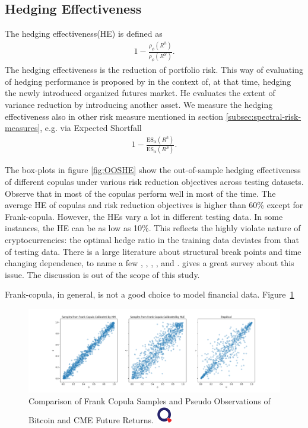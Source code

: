 \subsection{Hedging Effectiveness}\label{subsec:hedging-effectiveness}
The hedging effectiveness(HE) is defined as
\begin{align}
  1- \frac{\rho_\phi(R^h)}{\rho_\phi(R^S)}.
  \end{align}
The hedging effectiveness is the reduction of portfolio risk.
This way of evaluating of hedging performance is proposed by \cite{ederington1979hedging} in the context of, at that time, hedging the newly introduced
organized futures market.
He evaluates the extent of variance reduction by introducing another asset.
We measure the hedging effectiveness also in other risk measure mentioned in section \ref{subsec:spectral-risk-measures},
e.g. via Expected Shortfall
\begin{align}
  1- \frac{\text{ES}_\alpha(R^h)}{\text{ES}_\alpha(R^S)}.
  \end{align}

The box-plots in figure \ref{fig:OOSHE} show the out-of-sample hedging effectiveness of different copulas under various risk
reduction objectives across testing datasets.
Observe that in most of the copulas perform well in most of the time.
The average HE of copulas and risk reduction objectives is higher than 60\% except for Frank-copula.
However, the HEs vary a lot in different testing data.
In some instances, the HE can be as low as 10\%.
This reflects the highly violate nature of cryptocurrencies:
the optimal hedge ratio in the training data deviates from that of testing data.
There is a large literature about structural break points and time changing dependence, to name a few
\citet{hafner2012dynamic}, \citet{patton2006modelling}, \citet{creal2008general},
\citet{engle2002dynamic}, and \citet{giacomini2009inhomogeneous}.
\citet{manner2012survey} gives a great survey about this issue.
The discussion is out of the scope of this study.\medskip

Frank-copula, in general, is not a good choice to model financial data.
Figure~\ref{fig:Frank}

\begin{figure}[th]
   \centering
   \includegraphics[width=\textwidth]{_pics/Frank.png}
   \caption{Comparison of Frank Copula Samples and Pseudo Observations of Bitcoin and CME Future Returns.
   \href{http://www.quantlet.com/}{\includegraphics[width=20pt]{_pics/qletlogo_tr.png}}}
   \label{fig:Frank}
\end{figure}

